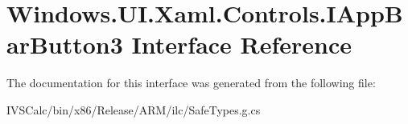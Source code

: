 \hypertarget{interface_windows_1_1_u_i_1_1_xaml_1_1_controls_1_1_i_app_bar_button3}{}\section{Windows.\+U\+I.\+Xaml.\+Controls.\+I\+App\+Bar\+Button3 Interface Reference}
\label{interface_windows_1_1_u_i_1_1_xaml_1_1_controls_1_1_i_app_bar_button3}


The documentation for this interface was generated from the following file\+:\begin{DoxyCompactItemize}
\item 
I\+V\+S\+Calc/bin/x86/\+Release/\+A\+R\+M/ilc/Safe\+Types.\+g.\+cs\end{DoxyCompactItemize}
